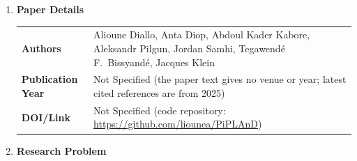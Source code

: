 \documentclass[11pt,a4paper]{article}
\newcommand{\entrypart}[1]{\textbf{\color{accent}#1}\par\vspace{2pt}}
\begin{document}
\begin{enumerate}

    \item \entrypart{Paper Details}

    \begin{tabular}{@{}>{\bfseries}p{3.2cm} p{11.5cm}@{}}
        Authors          & Alioune Diallo, Anta Diop, Abdoul Kader Kabore, Aleksandr Pilgun, Jordan Samhi, Tegawend\'{e} F.\ Bissyand\'{e}, Jacques Klein \\[2pt]
        Publication Year & Not Specified (the paper text gives no venue or year; latest cited references are from 2025) \\[2pt]
        DOI/Link         & Not Specified (code repository: \url{https://github.com/liounea/PiPLAnD})
    \end{tabular}

    \item \entrypart{Research Problem}


\end{enumerate}
\end{document}
